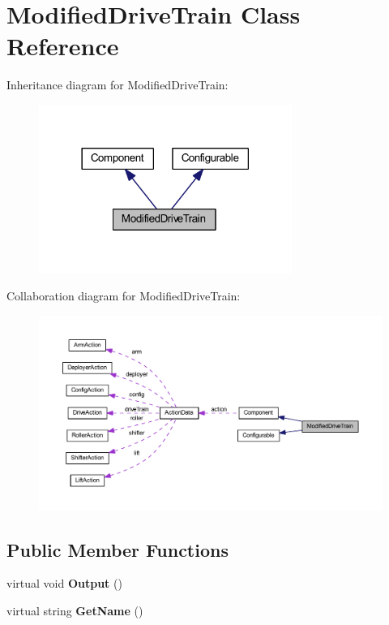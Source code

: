 \hypertarget{class_modified_drive_train}{
\section{\-Modified\-Drive\-Train \-Class \-Reference}
\label{class_modified_drive_train}
}


\-Inheritance diagram for \-Modified\-Drive\-Train\-:\nopagebreak
\begin{figure}[H]
\begin{center}
\leavevmode
\includegraphics[width=234pt]{class_modified_drive_train__inherit__graph}
\end{center}
\end{figure}


\-Collaboration diagram for \-Modified\-Drive\-Train\-:\nopagebreak
\begin{figure}[H]
\begin{center}
\leavevmode
\includegraphics[width=350pt]{class_modified_drive_train__coll__graph}
\end{center}
\end{figure}
\subsection*{\-Public \-Member \-Functions}
\begin{DoxyCompactItemize}
\item 
\hypertarget{class_modified_drive_train_a02e6460b8dc65be0df9712f05f13d56f}{
virtual void {\bfseries \-Output} ()}
\label{class_modified_drive_train_a02e6460b8dc65be0df9712f05f13d56f}

\item 
\hypertarget{class_modified_drive_train_a31c4714cecbde939346e2d3c5db5d3a6}{
virtual string {\bfseries \-Get\-Name} ()}
\label{class_modified_drive_train_a31c4714cecbde939346e2d3c5db5d3a6}

\end{DoxyCompactItemize}


